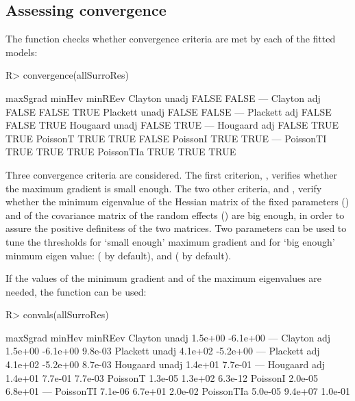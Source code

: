 \documentclass[article,shortnames, nojss]{jss}\usepackage[]{graphicx}\usepackage[]{color}
\begin{document}
\subsection{Assessing convergence}
The function  checks whether convergence criteria
are met by each of the fitted models:
\begin{Schunk}
\begin{Sinput}
R> convergence(allSurroRes)
\end{Sinput}
\begin{Soutput}
               maxSgrad minHev minREev
Clayton unadj     FALSE  FALSE     ---
Clayton adj       FALSE  FALSE    TRUE
Plackett unadj    FALSE  FALSE     ---
Plackett adj      FALSE  FALSE    TRUE
Hougaard unadj    FALSE   TRUE     ---
Hougaard adj      FALSE   TRUE    TRUE
PoissonT           TRUE   TRUE   FALSE
PoissonI           TRUE   TRUE     ---
PoissonTI          TRUE   TRUE    TRUE
PoissonTIa         TRUE   TRUE    TRUE
\end{Soutput}
\end{Schunk}
Three convergence criteria are considered.
The first criterion, ,
verifies whether the maximum gradient is small enough.
The two other criteria,  and ,
verify whether the minimum eigenvalue
of the Hessian matrix of the fixed parameters ()
and of the covariance matrix of the random effects ()
are big enough,
in order to assure the positive definitess of the two matrices.
Two parameters can be used to tune the thresholds
for `small enough' maximum gradient and 
for `big enough' minmum eigen value:
 ( by default),
and  ( by default).

If the values of the minimum gradient and of the maximum eigenvalues are needed,
the function  can be used:
\begin{Schunk}
\begin{Sinput}
R> convals(allSurroRes)
\end{Sinput}
\begin{Soutput}
               maxSgrad   minHev minREev
Clayton unadj   1.5e+00 -6.1e+00     ---
Clayton adj     1.5e+00 -6.1e+00 9.8e-03
Plackett unadj  4.1e+02 -5.2e+00     ---
Plackett adj    4.1e+02 -5.2e+00 8.7e-03
Hougaard unadj  1.4e+01  7.7e-01     ---
Hougaard adj    1.4e+01  7.7e-01 7.7e-03
PoissonT        1.3e-05  1.3e+02 6.3e-12
PoissonI        2.0e-05  6.8e+01     ---
PoissonTI       7.1e-06  6.7e+01 2.0e-02
PoissonTIa      5.0e-05  9.4e+07 1.0e-01
\end{Soutput}
\end{Schunk}
\end{document}
